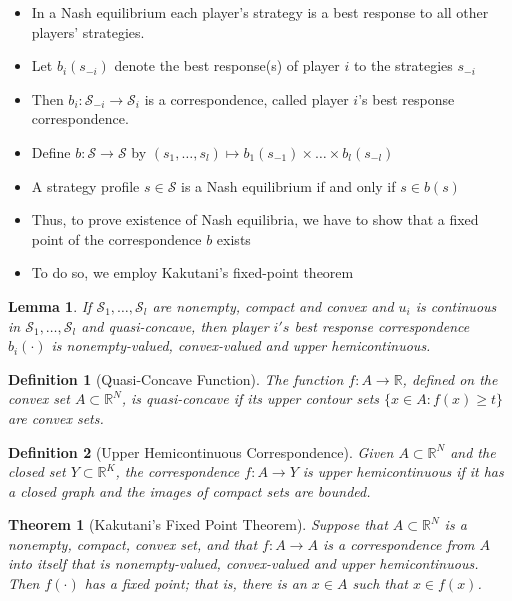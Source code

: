 \documentclass[12pt]{extreport} %
\theoremstyle{named}
\theoremstyle{itshape}
\newtheorem{theorem}[unnamedtheorem]{Theorem}
\newtheorem*{definition}{Definition}
\theoremstyle{normal}
\newtheorem{lemma}[unnamedtheorem]{Lemma}
\begin{document}
\begin{itemize}
	\item In a Nash equilibrium each player's strategy is a best response to all other players' strategies.
	\item Let $b_i(s_{-i})$ denote the best response(s) of player $i$ to the strategies $s_{-i}$
	\item Then $b_i \colon \mathcal{S}_{-i} \rightarrow \mathcal{S}_i$ is a correspondence, called player $i$'s best response correspondence.
	\item Define $b \colon \mathcal{S} \rightarrow \mathcal{S}$ by $(s_1, \dotsc, s_l) \mapsto b_1(s_{-1}) \times \dotsc \times b_l(s_{-l})$
	\item A strategy profile $s \in \mathcal{S}$ is a Nash equilibrium if and only if $s \in b(s)$
	\item Thus, to prove existence of Nash equilibria, we have to show that a fixed point of the correspondence $b$ exists
	\item To do so, we employ Kakutani's fixed-point theorem
\end{itemize} 
 
\begin{lemma}
	If $\mathcal{S}_1, \dotsc, \mathcal{S}_l$ are nonempty, compact and convex and $u_i$ is continuous in $\mathcal{S}_1, \dotsc, \mathcal{S}_l$ and quasi-concave, then player $i's$ best response correspondence $b_i(\cdot)$ is nonempty-valued, convex-valued and upper hemicontinuous.
\end{lemma} 
 
\begin{definition}[Quasi-Concave Function]
	The function $f \colon A \rightarrow \mathbb{R}$, defined on the convex set $A \subset \mathbb{R}^N$, is quasi-concave if its upper contour sets $\{ x \in A \colon f(x) \geq t \}$ are convex sets.
\end{definition} 
 
\begin{definition}[Upper Hemicontinuous Correspondence]
	Given $A \subset \mathbb{R}^{N}$ and the closed set $Y \subset \mathbb{R}^{K}$, the correspondence $f \colon A \rightarrow Y$ is upper hemicontinuous if it has a closed graph and the images of compact sets are bounded.
\end{definition} 

\begin{theorem}[Kakutani's Fixed Point Theorem]
	Suppose that $A \subset \mathbb{R}^N$ is a nonempty, compact, convex set, and that $f \colon A \rightarrow A$ is a correspondence from $A$ into itself that is nonempty-valued, convex-valued and upper hemicontinuous. ~\\
	
	Then $f(\cdot)$ has a fixed point; that is, there is an $x \in A$ such that $x \in f(x)$.
\end{theorem}
 
\end{document}
